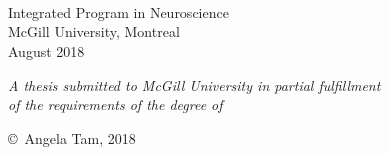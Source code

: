\documentclass[
12pt, %
oneside, %
english, %
onehalfspacing, %
liststotoc, %
toctotoc, %
headsepline, %
consistentlayout, %
]{McGillThesis} %
\author{\textsc{Angela Tam}} %
\begin{document}
\frontmatter %

\pagestyle{plain} %


\begin{titlepage}
\begin{center}

\vspace*{.06\textheight}

\HRule \\[0.4cm] %
{\huge \bfseries \ttitle\par}\vspace{0.4cm} %
\HRule \\[1.5cm] %


{\Large \authorname}\\ %
Integrated Program in Neuroscience\\
McGill University, Montreal\\
August 2018

\vfill

\small \textit{A thesis submitted to McGill University in partial fulfillment\\ of the requirements of the degree of \degreename}\\[0.3cm] %


\vfill

{\small \copyright\ Angela Tam, 2018}\\[1cm] %

\vfill
\end{center}
\end{titlepage}

\end{document}
